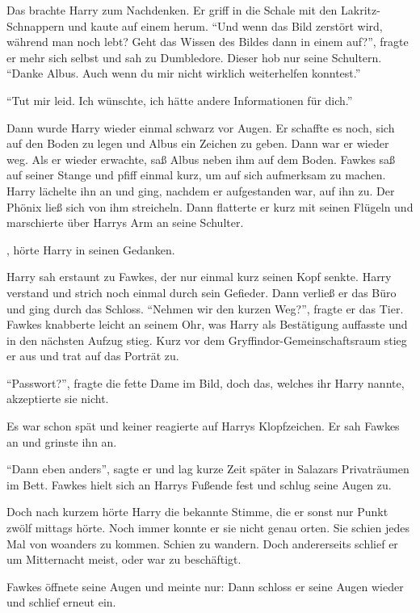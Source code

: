 Das brachte Harry zum Nachdenken. Er griff in die Schale mit den Lakritz-Schnappern und kaute auf einem herum. \enquote{Und wenn das Bild zerstört wird, während man noch lebt? Geht das Wissen des Bildes dann in einem auf?}, fragte er mehr sich selbst und sah zu Dumbledore. Dieser hob nur seine Schultern. \enquote{Danke Albus. \gst Auch wenn du mir nicht wirklich weiterhelfen konntest.}

\enquote{Tut mir leid. Ich wünschte, ich hätte andere Informationen für dich.}

Dann wurde Harry wieder einmal schwarz vor Augen. Er schaffte es noch, sich auf den Boden zu legen und Albus ein Zeichen zu geben. Dann war er wieder weg. Als er wieder erwachte, saß Albus neben ihm auf dem Boden. Fawkes saß auf seiner Stange und pfiff einmal kurz, um auf sich aufmerksam zu machen. Harry lächelte ihn an und ging, nachdem er aufgestanden war, auf ihn zu. Der Phönix ließ sich von ihm streicheln. Dann flatterte er kurz mit seinen Flügeln und marschierte über Harrys Arm an seine Schulter.

, hörte Harry in seinen Gedanken.

Harry sah erstaunt zu Fawkes, der nur einmal kurz seinen Kopf senkte. Harry verstand und strich noch einmal durch sein Gefieder. Dann verließ er das Büro und ging durch das Schloss. \enquote{Nehmen wir den kurzen Weg?}, fragte er das Tier. Fawkes knabberte leicht an seinem Ohr, was Harry als Bestätigung auffasste und in den nächsten Aufzug stieg. Kurz vor dem Gryffindor-Gemeinschaftsraum stieg er aus und trat auf das Porträt zu.

\enquote{Passwort?}, fragte die fette Dame im Bild, doch das, welches ihr Harry nannte, akzeptierte sie nicht.

Es war schon spät und keiner reagierte auf Harrys Klopfzeichen. Er sah Fawkes an und grinste ihn an.

\enquote{Dann eben anders}, sagte er und lag kurze Zeit später in Salazars Privaträumen im Bett. Fawkes hielt sich an Harrys Fußende fest und schlug seine Augen zu.

Doch nach kurzem hörte Harry die bekannte Stimme, die er sonst nur Punkt zwölf mittags hörte.  Noch immer konnte er sie nicht genau orten. Sie schien jedes Mal von woanders zu kommen. Schien zu wandern. Doch andererseits schlief er um Mitternacht meist, oder war zu beschäftigt.

Fawkes öffnete seine Augen und meinte nur:  Dann schloss er seine Augen wieder und schlief erneut ein.

